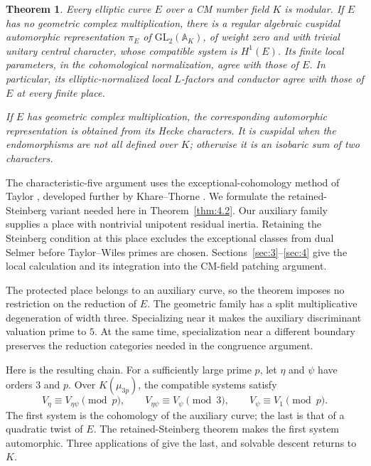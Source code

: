 \documentclass[11pt,a4paper]{article}
\newtheorem{theorem}{Theorem}[section]
\numberwithin{equation}{section}
\begin{document}
\begin{theorem}\label{thm:1.1}
Every elliptic curve \(E\) over a CM number field \(K\) is modular. If \(E\) has no geometric complex multiplication, there is a regular algebraic cuspidal automorphic representation \(\pi_E\) of \(\mathrm{GL}_2(\mathbb A_K)\), of weight zero and with trivial unitary central character, whose compatible system is \(H^1(E)\). Its finite local parameters, in the cohomological normalization, agree with those of \(E\). In particular, its elliptic-normalized local \(L\)-factors and conductor agree with those of \(E\) at every finite place.

If \(E\) has geometric complex multiplication, the corresponding automorphic representation is obtained from its Hecke characters. It is cuspidal when the endomorphisms are not all defined over \(K\); otherwise it is an isobaric sum of two characters.
\end{theorem}

The characteristic-five argument uses the exceptional-cohomology method of Taylor \cite[\S1, condition E3 and Lemma~1.2]{Tay03}, developed further by Khare--Thorne \cite[Introduction and Propositions~6.6 and~6.10]{KT}. We formulate the retained-Steinberg variant needed here in Theorem~\ref{thm:4.2}. Our auxiliary family supplies a place with nontrivial unipotent residual inertia. Retaining the Steinberg condition at this place excludes the exceptional classes from dual Selmer before Taylor--Wiles primes are chosen. Sections~\ref{sec:3}--\ref{sec:4} give the local calculation and its integration into the CM-field patching argument.

The protected place belongs to an auxiliary curve, so the theorem imposes no restriction on the reduction of \(E\). The geometric family has a split multiplicative degeneration of width three. Specializing near it makes the auxiliary discriminant valuation prime to \(5\). At the same time, specialization near a different boundary preserves the reduction categories needed in the congruence argument.

Here is the resulting chain. For a sufficiently large prime \(p\), let \(\eta\) and \(\psi\) have orders \(3\) and \(p\). Over \(K(\mu_{3p})\), the compatible systems satisfy
\begin{equation*}
V_\eta \equiv V_{\eta\psi}\pmod p,
\qquad V_{\eta\psi}\equiv V_\psi\pmod3,
\qquad V_\psi\equiv V_1\pmod p.
\end{equation*}
The first system is the cohomology of the auxiliary curve; the last is that of a quadratic twist of \(E\). The retained-Steinberg theorem makes the first system automorphic. Three applications of \cite[Theorem~5.2]{CN} give the last, and solvable descent returns to \(K\).
\end{document}
